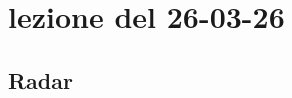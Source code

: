 \documentclass[11pt,a4paper]{article}
\begin{document}
\section{lezione del 26-03-26}
\subsection{Radar}\label{sub:radar_} %

\end{document}
